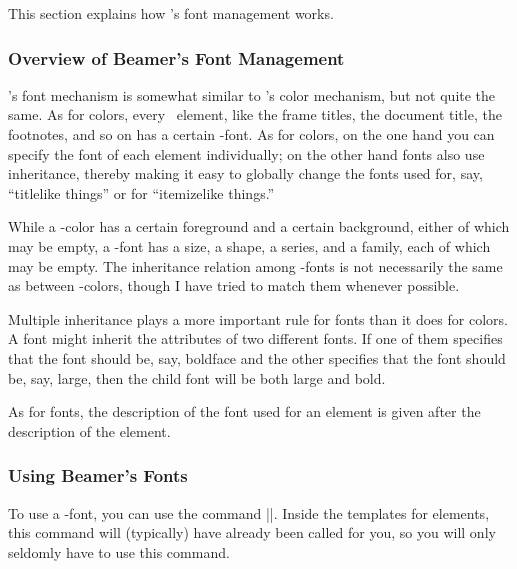 This section explains how \beamer's font management works.

\subsubsection{Overview of Beamer's Font Management}

\beamer's font mechanism is somewhat similar to \beamer's color
mechanism, but not quite the same. As for colors, every \beamer\
element, like the frame titles, the document title, the footnotes, and
so on has a certain \beamer-font. As for colors, on the one hand you
can specify the font of each element individually; on the other hand
fonts also use inheritance, thereby making it easy to globally change
the fonts used for, say, ``titlelike things'' or for ``itemizelike
things.''

While a \beamer-color has a certain foreground and a certain
background, either of which may be empty, a \beamer-font has a size, a
shape, a series, and a family, each of which may be empty. The
inheritance relation among \beamer-fonts is not necessarily the same
as between \beamer-colors, though I have tried to match them whenever
possible. 

Multiple inheritance plays a more important rule for
fonts than it does for colors. A font might inherit the attributes of
two different fonts. If one of them specifies that the font should be,
say, boldface and the other specifies that the font should be, say,
large, then the child font will be both large and bold. 

As for fonts, the description of the font used for an element is given
after the description of the element. 


\subsubsection{Using Beamer's Fonts}

To use a \beamer-font, you can use the command
|\usebeamerfont|. Inside the templates for elements, this command will
(typically) have already been called for you, so you will only
seldomly have to use this command. 

